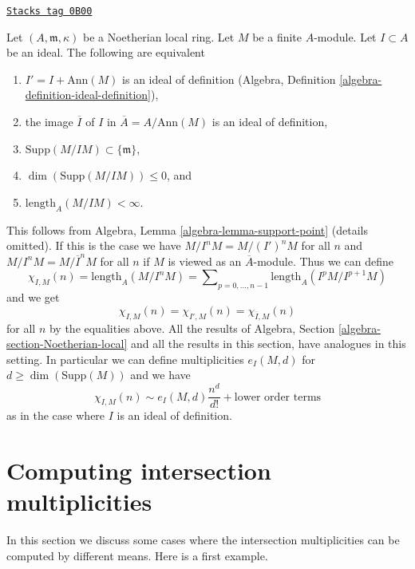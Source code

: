 \begin{remark}

\label{intersection-remark-trivial-generalization}
\href{https://stacks.math.columbia.edu/tag/0B00}{\texttt{Stacks tag 0B00}}

Let $(A, \mathfrak m, \kappa)$ be a Noetherian local ring.
Let $M$ be a finite $A$-module. Let $I \subset A$ be an ideal.
The following are equivalent
\begin{enumerate}
\item $I' = I + \text{Ann}(M)$ is an ideal of definition
(Algebra, Definition \ref{algebra-definition-ideal-definition}),
\item the image $\overline{I}$ of $I$ in $\overline{A} = A/\text{Ann}(M)$
is an ideal of definition,
\item $\text{Supp}(M/IM) \subset \{\mathfrak m\}$,
\item $\dim(\text{Supp}(M/IM)) \leq 0$, and
\item $\text{length}_A(M/IM) < \infty$.
\end{enumerate}
This follows from Algebra, Lemma \ref{algebra-lemma-support-point}
(details omitted). If this is the case we have $M/I^nM = M/(I')^nM$
for all $n$ and $M/I^nM = M/\overline{I}^nM$ for all $n$
if $M$ is viewed as an $\overline{A}$-module.
Thus we can define
$$
\chi_{I, M}(n) = \text{length}_A(M/I^nM) =
\sum\nolimits_{p = 0, \ldots, n - 1} \text{length}_A(I^pM/I^{p + 1}M)
$$
and we get
$$
\chi_{I, M}(n) = \chi_{I', M}(n) = \chi_{\overline{I}, M}(n)
$$
for all $n$ by the equalities above.
All the results of Algebra, Section \ref{algebra-section-Noetherian-local}
and all the results in this section, have analogues in this setting.
In particular we can define multiplicities $e_I(M, d)$ for
$d \geq \dim(\text{Supp}(M))$ and we have
$$
\chi_{I, M}(n) \sim e_I(M, d) \frac{n^d}{d!} + \text{lower order terms}
$$
as in the case where $I$ is an ideal of definition.
\end{remark}

\section{Computing intersection multiplicities}
\label{intersection-section-computing-intersection-multiplicities}
In this section we discuss some cases where the intersection multiplicities
can be computed by different means. Here is a first example.

